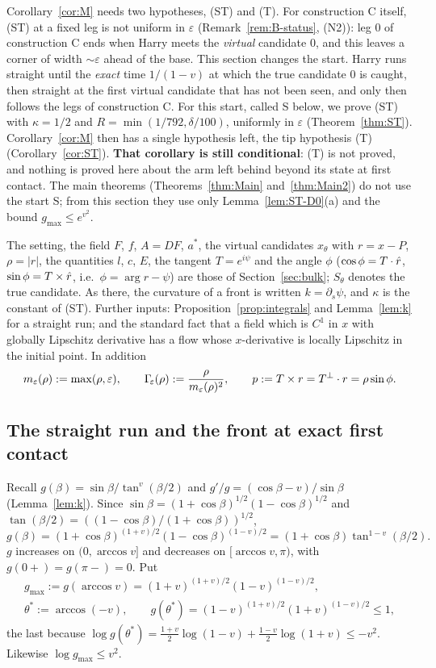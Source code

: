 Corollary~\ref{cor:M} needs two hypotheses, \textup{(ST)} and \textup{(T)}. For construction C itself, \textup{(ST)} at a fixed leg
is not uniform in $\varepsilon$ (Remark~\ref{rem:B-status}, (N2)): leg $0$ of construction C ends when Harry meets the
\emph{virtual} candidate $0$, and this leaves a corner of width $\sim\varepsilon$ ahead of the base. This section changes the start.
Harry runs straight until the \emph{exact} time $1/(1-v)$ at which the true candidate $0$ is caught, then straight at the first
virtual candidate that has not been seen, and only then follows the legs of construction C. For this start, called S below,
we prove \textup{(ST)} with $\kappa=1/2$ and $R=\min(1/792,\delta/100)$, uniformly in $\varepsilon$ (Theorem~\ref{thm:ST}). Corollary~\ref{cor:M}
then has a single hypothesis left, the tip hypothesis \textup{(T)} (Corollary~\ref{cor:ST}). \textbf{That corollary is still
conditional}: \textup{(T)} is not proved, and nothing is proved here about the arm left behind beyond its state at first contact.
The main theorems (Theorems~\ref{thm:Main} and~\ref{thm:Main2}) do not use the start S; from this section they use only Lemma~\ref{lem:ST-D0}(a) and
the bound $g_{\max}\le e^{v^2}$.

The setting, the field $F$, $f$, $A=DF$, $a^*$, the virtual candidates $x_\theta$ with $r=x-P$, $\rho=|r|$, the quantities $l$, $c$,
$E$, the tangent $T=e^{i\psi}$ and the angle $\phi$ ($\cos\phi=T\cdot\hat r$, $\sin\phi=T\times\hat r$, i.e.\ $\phi=\arg r-\psi$) are those
of Section~\ref{sec:bulk}; $S_\theta$ denotes the true candidate. As there, the curvature of a front is written $k=\partial_s\psi$, and
$\kappa$ is the constant of \textup{(ST)}. Further inputs: Proposition~\ref{prop:integrals} and Lemma~\ref{lem:k} for a straight run;
and the standard fact that a field which is $C^1$ in $x$ with globally Lipschitz derivative has a flow whose $x$-derivative is locally
Lipschitz in the initial point. In addition
\[
m_\varepsilon(\rho):=\max(\rho,\varepsilon),\qquad\Gamma_{\!\varepsilon}(\rho):=\frac\rho{m_\varepsilon(\rho)^2},\qquad p:=T\times r=T^\perp\cdot r=\rho\sin\phi .
\]

\subsection{The straight run and the front at exact first contact}

Recall $g(\beta)=\sin\beta/\tan^v(\beta/2)$ and $g'/g=(\cos\beta-v)/\sin\beta$ (Lemma~\ref{lem:k}). Since
$\sin\beta=(1+\cos\beta)^{1/2}(1-\cos\beta)^{1/2}$ and $\tan(\beta/2)=((1-\cos\beta)/(1+\cos\beta))^{1/2}$,
\[
g(\beta)=(1+\cos\beta)^{(1+v)/2}(1-\cos\beta)^{(1-v)/2}=(1+\cos\beta)\tan^{1-v}(\beta/2).
\]
$g$ increases on $(0,\arccos v]$ and decreases on $[\arccos v,\pi)$, with $g(0+)=g(\pi-)=0$. Put
\begin{gather*}
g_{\max}:=g(\arccos v)=(1+v)^{(1+v)/2}(1-v)^{(1-v)/2},\\
\theta^*:=\arccos(-v),\qquad g(\theta^*)=(1-v)^{(1+v)/2}(1+v)^{(1-v)/2}\le1,
\end{gather*}
the last because $\log g(\theta^*)=\frac{1+v}2\log(1-v)+\frac{1-v}2\log(1+v)\le-v^2$. Likewise $\log g_{\max}\le v^2$.

